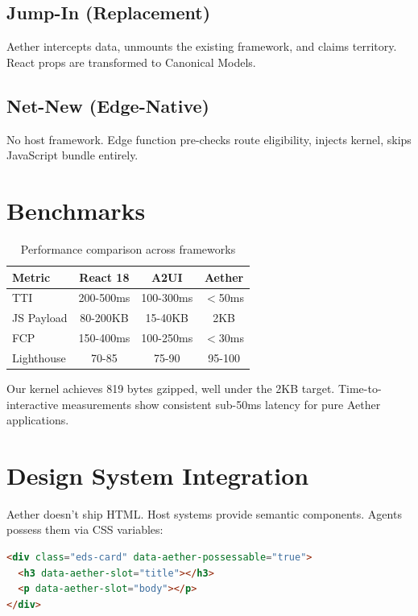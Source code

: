 \documentclass[11pt]{article}
\begin{document}
\subsection{Jump-In (Replacement)}
Aether intercepts data, unmounts the existing framework, and claims territory. React props are transformed to Canonical Models.

\subsection{Net-New (Edge-Native)}
No host framework. Edge function pre-checks route eligibility, injects kernel, skips JavaScript bundle entirely.

\section{Benchmarks}

\begin{table}[h]
\centering
\begin{tabular}{lccc}
\toprule
Metric & React 18 & A2UI & Aether \\
\midrule
TTI & 200-500ms & 100-300ms & $<$50ms \\
JS Payload & 80-200KB & 15-40KB & 2KB \\
FCP & 150-400ms & 100-250ms & $<$30ms \\
Lighthouse & 70-85 & 75-90 & 95-100 \\
\bottomrule
\end{tabular}
\caption{Performance comparison across frameworks}
\end{table}

Our kernel achieves 819 bytes gzipped, well under the 2KB target. Time-to-interactive measurements show consistent sub-50ms latency for pure Aether applications.

\section{Design System Integration}

Aether doesn't ship HTML. Host systems provide semantic components. Agents possess them via CSS variables:

\begin{lstlisting}[language=HTML, caption=Slot-based possession]
<div class="eds-card" data-aether-possessable="true">
  <h3 data-aether-slot="title"></h3>
  <p data-aether-slot="body"></p>
</div>
\end{lstlisting}
\end{document}
